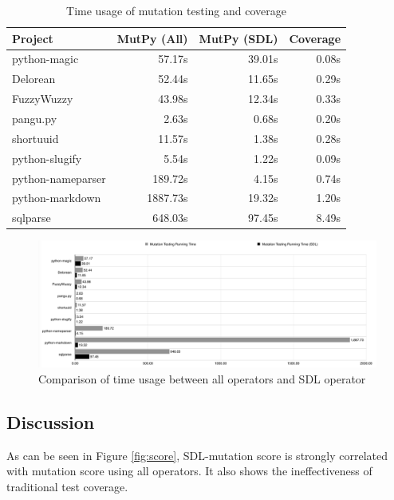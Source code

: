 \documentclass[12pt]{article}
\begin{document}
\begin{table}[H]
\begin{center}
\caption{Time usage of mutation testing and coverage}
\label{table:time}
\begin{tabular}{|l|r|r|r|}
\hline
{\bf Project} & {\bf MutPy (All)} & {\bf MutPy (SDL)} & {\bf Coverage} \\
\hline
python-magic      &   57.17s & 39.01s & 0.08s \\
Delorean          &   52.44s & 11.65s & 0.29s \\
FuzzyWuzzy        &   43.98s & 12.34s & 0.33s \\
pangu.py          &    2.63s &  0.68s & 0.20s \\
shortuuid         &   11.57s &  1.38s & 0.28s \\
python-slugify    &    5.54s &  1.22s & 0.09s \\
python-nameparser &  189.72s &  4.15s & 0.74s \\
python-markdown   & 1887.73s & 19.32s & 1.20s \\
sqlparse          &  648.03s & 97.45s & 8.49s \\
\hline
\end{tabular}
\end{center}
\end{table}

\begin{figure}[H]
\begin{center}
\caption{Comparison of time usage between all operators and SDL operator}
\label{fig:time}
\includegraphics[width=15cm]{time}
\end{center}
\end{figure}

\subsection{Discussion}

As can be seen in Figure \ref{fig:score}, SDL-mutation score is strongly correlated with mutation score using all operators. It also shows the ineffectiveness of traditional test coverage.
\end{document}
